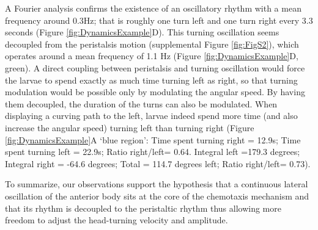 \documentclass[11pt,a4paper]{article}
\newcommand{\todoKL}[1]{\todo[author=KL,color=blue!40, size=\tiny,inline]{1}}
\begin{document}
A Fourier analysis confirms the existence of an oscillatory rhythm with a mean frequency around 0.3Hz; that is roughly one turn left and one turn right every 3.3 seconds (Figure \ref{fig:DynamicsExample}D). This turning oscillation seems decoupled from the peristalsis motion (supplemental Figure \ref{fig:FigS2}), which operates around a mean frequency of 1.1 Hz (Figure \ref{fig:DynamicsExample}D, green).
\todoKL{point of coupling peristalsis to turn reads unclear/ consider rephrasing}
 A direct coupling between peristalsis and turning oscillation would force the larvae to spend exactly as much time turning left as right, so that turning modulation would be possible only by modulating the angular speed. By having them decoupled, the duration of the turns can also be modulated. When displaying a curving path to the left, larvae indeed spend more time (and also increase the angular speed) turning left than turning right (Figure \ref{fig:DynamicsExample}A ‘blue region’:  Time spent turning right = 12.9s; Time spent turning left = 22.9s; Ratio right/left= 0.64. Integral left =179.3 degrees; Integral right = -64.6 degrees; Total = 114.7 degrees left; Ratio right/left= 0.73).

To summarize, our observations support the hypothesis that a continuous lateral oscillation of the anterior body sits at the core of the chemotaxis mechanism and that its rhythm is decoupled to the peristaltic rhythm thus allowing more freedom to adjust the head-turning velocity and amplitude.
\end{document}
